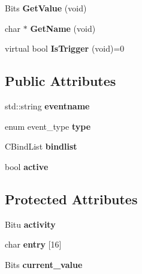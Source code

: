 \begin{DoxyCompactItemize}
\item 
\hypertarget{classCEvent_ad4e49c2aa32efecdc91c9439e858b940}{Bits {\bfseries Get\-Value} (void)}\label{classCEvent_ad4e49c2aa32efecdc91c9439e858b940}

\item 
\hypertarget{classCEvent_a4693b4e54c079cc97f0522eb15154953}{char $\ast$ {\bfseries Get\-Name} (void)}\label{classCEvent_a4693b4e54c079cc97f0522eb15154953}

\item 
\hypertarget{classCEvent_affd064f43309b5fc4966edb36935723d}{virtual bool {\bfseries Is\-Trigger} (void)=0}\label{classCEvent_affd064f43309b5fc4966edb36935723d}

\end{DoxyCompactItemize}
\subsection*{Public Attributes}
\begin{DoxyCompactItemize}
\item 
\hypertarget{classCEvent_a9543179cd76d08369201e992ca41728c}{std\-::string {\bfseries eventname}}\label{classCEvent_a9543179cd76d08369201e992ca41728c}

\item 
\hypertarget{classCEvent_a5612c4e4e1d0cfc08e1640fee8bacf85}{enum event\-\_\-type {\bfseries type}}\label{classCEvent_a5612c4e4e1d0cfc08e1640fee8bacf85}

\item 
\hypertarget{classCEvent_a0c900c0aab7bf38d7ac8769d5e4f6a5a}{C\-Bind\-List {\bfseries bindlist}}\label{classCEvent_a0c900c0aab7bf38d7ac8769d5e4f6a5a}

\item 
\hypertarget{classCEvent_af1e4934eb75e5636f81918c13983e2e3}{bool {\bfseries active}}\label{classCEvent_af1e4934eb75e5636f81918c13983e2e3}

\end{DoxyCompactItemize}
\subsection*{Protected Attributes}
\begin{DoxyCompactItemize}
\item 
\hypertarget{classCEvent_a487786e4e537594bf963e96aecae85cd}{Bitu {\bfseries activity}}\label{classCEvent_a487786e4e537594bf963e96aecae85cd}

\item 
\hypertarget{classCEvent_a20cca21cb3c606f3161a2757c1ba466d}{char {\bfseries entry} \mbox{[}16\mbox{]}}\label{classCEvent_a20cca21cb3c606f3161a2757c1ba466d}

\item 
\hypertarget{classCEvent_a7bbacdb8e3c5ee41ce13af19dc21db2d}{Bits {\bfseries current\-\_\-value}}\label{classCEvent_a7bbacdb8e3c5ee41ce13af19dc21db2d}

\end{DoxyCompactItemize}



